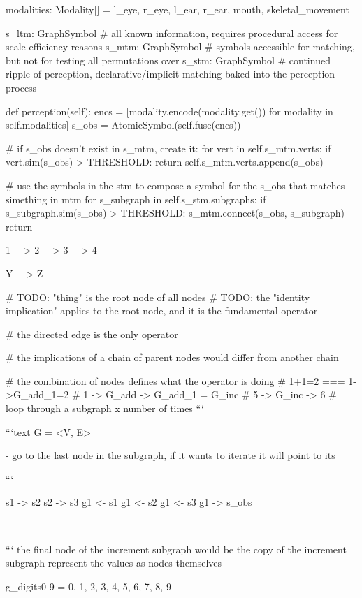     modalities: Modality[] = l_eye, r_eye, l_ear, r_ear, mouth, skeletal_movement

    s_ltm: GraphSymbol \# all known information, requires procedural access for scale efficiency reasons
    s_mtm: GraphSymbol \# symbols accessible for matching, but not for testing all permutations over
    s_stm: GraphSymbol \# continued ripple of perception, declarative/implicit matching baked into the perception process

    def perception(self):
        encs = [modality.encode(modality.get()) for modality in self.modalities]
        s_obs = AtomicSymbol(self.fuse(encs))

        \# if s_obs doesn't exist in s_mtm, create it:
        for vert in self.s_mtm.verts:
            if vert.sim(s_obs) > THRESHOLD:
                return
        self.s_mtm.verts.append(s_obs)

        \# use the symbols in the stm to compose a symbol for the s_obs that matches simething in mtm
        for s_subgraph in self.s_stm.subgraphs:
            if s_subgraph.sim(s_obs) > THRESHOLD:
                s_mtm.connect(s_obs, s_subgraph)
                return

1 ---> 2 ---> 3 ---> 4

Y ---> Z


\# TODO: "thing" is the root node of all nodes
\# TODO: the "identity implication" applies to the root node, and it is the fundamental operator

\# the directed edge is the only operator

\# the implications of a chain of parent nodes would differ from another chain

\# the combination of nodes defines what the operator is doing
\# 1+1=2 === 1->G_add_1=2
\# 1 -> G_add -> G_add_1 = G_inc
\# 5 -> G_inc -> 6
\# loop through a subgraph x number of times
```

```text
G = <V, E>

- go to the last node in the subgraph, if it wants to iterate it will point to its 


```


s1 -> s2
s2 -> s3
g1 <- s1
g1 <- s2
g1 <- s3
g1 -> s_obs


-------------

```
the final node of the increment subgraph would be the copy of the increment subgraph
represent the values as nodes themselves

g_digits0-9 = {0, 1, 2, 3, 4, 5, 6, 7, 8, 9}

